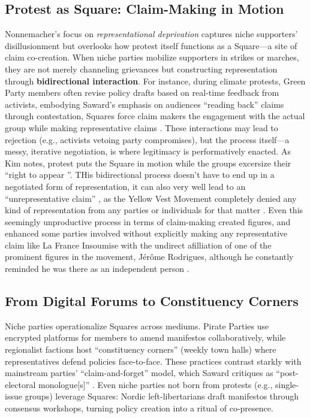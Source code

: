 \subsection{Protest as Square: Claim-Making in Motion}
Nonnemacher’s focus on \textit{representational deprivation} \parencite{nonnemacher2023} captures niche supporters’ disillusionment but overlooks how protest itself functions as a Square—a site of claim co-creation. When niche parties mobilize supporters in strikes or marches, they are not merely channeling grievances but constructing representation through \textbf{bidirectional interaction}. For instance, during climate protests, Green Party members often revise policy drafts based on real-time feedback from activists, embodying Saward’s emphasis on audiences \enquote{reading back} claims through contestation, Squares force claim makers the engagement with the actual group while making representative claims \parencite[see 7]{saward2024}. These interactions may lead to rejection (e.g., activists vetoing party compromises), but the process itself—a messy, iterative negotiation, is where legitimacy is performatively enacted. As Kim notes, protest puts the Square in motion while the groups excersize their \enquote{right to appear }\parencite[10]{kim2024}. THis bidirectional process doesn't have to end up in a negotiated form of representation, it can also very well lead to an \enquote{unrepresentative claim} \parencite{hayat2022, hayat2024}, as the Yellow Vest Movement completely denied any kind of representation from any parties or individuals for that matter \parencite[1038-1039]{hayat2022}. Even this seemingly unproductive process in terms of claim-making created figures, and enhanced some parties involved without explicitly making any representative claim like La France Insoumise with the undirect afilliation of one of the prominent figures in the movement, Jérôme Rodrigues, although he constantly reminded he was there as an independent person \parencite[1043]{hayat2022}.

\subsection{From Digital Forums to Constituency Corners}
Niche parties operationalize Squares across mediums. Pirate Parties use encrypted platforms for members to amend manifestos collaboratively, while regionalist factions host \enquote{constituency corners} (weekly town halls) where representatives defend policies face-to-face. These practices contrast starkly with mainstream parties’ \enquote{claim-and-forget} model, which Saward critiques as \enquote{post-electoral monologue[s]} \parencite[8]{saward2024}. Even niche parties not born from protests (e.g., single-issue groups) leverage Squares: Nordic left-libertarians draft manifestos through consensus workshops, turning policy creation into a ritual of co-presence.

